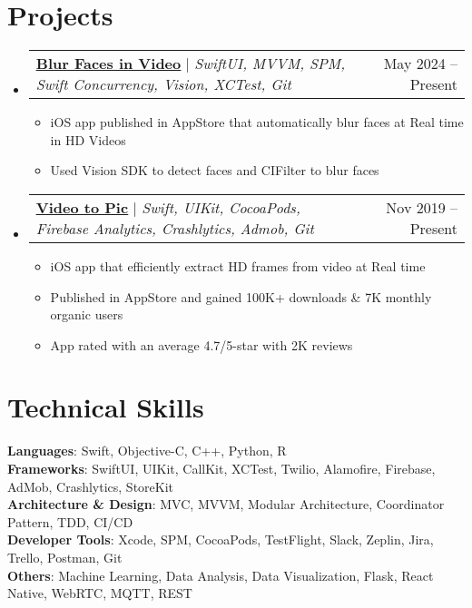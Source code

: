 \documentclass[letterpaper,11pt]{article}
\makeatletter
\newcommand{\resumeItem}[1]{
  \item\small{
    {#1 \vspace{-2pt}}
  }
}
\newcommand{\resumeProjectHeading}[2]{
    \item
    \begin{tabular*}{0.97\textwidth}{l@{\extracolsep{\fill}}r}
      \small#1 & #2 \\
    \end{tabular*}\vspace{-7pt}
}
\newcommand{\resumeSubHeadingListStart}{\begin{itemize}[leftmargin=0.15in, label={}]}
\newcommand{\resumeSubHeadingListEnd}{\end{itemize}}
\newcommand{\resumeItemListStart}{\begin{itemize}}
\newcommand{\resumeItemListEnd}{\end{itemize}\vspace{-5pt}}
\makeatother
\begin{document}
\section{Projects}
    \resumeSubHeadingListStart
      \resumeProjectHeading
          {\href{https://apps.apple.com/gb/app/video-face-blur/id6504180284}{\underline{\textbf{Blur Faces in Video}}} $|$ \emph{SwiftUI, MVVM, SPM, Swift Concurrency, Vision,  XCTest, Git}}{May 2024 -- Present}
          \resumeItemListStart
            \resumeItem{iOS app published in AppStore that automatically blur faces at Real time in HD Videos}
            \resumeItem{Used Vision SDK to detect faces and CIFilter to blur faces}
          \resumeItemListEnd
      \resumeProjectHeading
          {\href{https://apps.apple.com/us/app/video-to-pic/id1478306635}{\underline{\textbf{Video to Pic}}} $|$ \emph{Swift, UIKit, CocoaPods,  Firebase Analytics, Crashlytics, Admob, Git}}{Nov 2019 -- Present}
          \resumeItemListStart
            \resumeItem{ iOS app that efficiently extract HD frames from video at Real time}
            \resumeItem{Published in AppStore and gained 100K+ downloads \& 7K monthly organic users}
            \resumeItem{App rated with an average 4.7/5-star with 2K reviews}
          \resumeItemListEnd
    \resumeSubHeadingListEnd




%
\section{Technical Skills}
 \begin{itemize}[leftmargin=0.15in, label={}]
    \small{\item{
     \textbf{Languages}{:  Swift, Objective-C, C++, Python, R} \\
     \textbf{Frameworks}{: SwiftUI, UIKit, CallKit, XCTest, Twilio, Alamofire, Firebase, AdMob, Crashlytics, StoreKit} \\
     \textbf{Architecture \& Design}{: MVC, MVVM, Modular Architecture, Coordinator Pattern, TDD, CI/CD}\\
     \textbf{Developer Tools}{: Xcode, SPM, CocoaPods,  TestFlight,  Slack, Zeplin, Jira, Trello, Postman, Git} \\
     \textbf{Others}{:  Machine Learning, Data Analysis, Data Visualization, Flask, React Native, WebRTC, MQTT, REST}
    }}
 \end{itemize}


\end{document}

